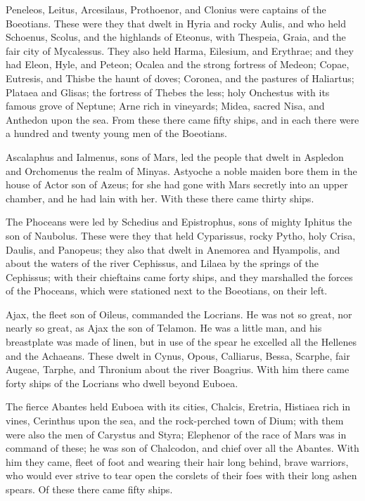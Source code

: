 Peneleos, Leitus, Arcesilaus, Prothoenor, and Clonius were captains of the
Boeotians. These were they that dwelt in Hyria and rocky Aulis, and who
held Schoenus, Scolus, and the highlands of Eteonus, with Thespeia, Graia,
and the fair city of Mycalessus. They also held Harma, Eilesium, and
Erythrae; and they had Eleon, Hyle, and Peteon; Ocalea and the strong
fortress of Medeon; Copae, Eutresis, and Thisbe the haunt of doves;
Coronea, and the pastures of Haliartus; Plataea and Glisas; the fortress
of Thebes the less; holy Onchestus with its famous grove of Neptune; Arne
rich in vineyards; Midea, sacred Nisa, and Anthedon upon the sea. From
these there came fifty ships, and in each there were a hundred and twenty
young men of the Boeotians.

Ascalaphus and Ialmenus, sons of Mars, led the people that dwelt in
Aspledon and Orchomenus the realm of Minyas. Astyoche a noble maiden bore
them in the house of Actor son of Azeus; for she had gone with Mars
secretly into an upper chamber, and he had lain with her. With these there
came thirty ships.

The Phoceans were led by Schedius and Epistrophus, sons of mighty Iphitus
the son of Naubolus. These were they that held Cyparissus, rocky Pytho,
holy Crisa, Daulis, and Panopeus; they also that dwelt in Anemorea and
Hyampolis, and about the waters of the river Cephissus, and Lilaea by the
springs of the Cephissus; with their chieftains came forty ships, and they
marshalled the forces of the Phoceans, which were stationed next to the
Boeotians, on their left.

Ajax, the fleet son of Oileus, commanded the Locrians. He was not so
great, nor nearly so great, as Ajax the son of Telamon. He was a little
man, and his breastplate was made of linen, but in use of the spear he
excelled all the Hellenes and the Achaeans. These dwelt in Cynus, Opous,
Calliarus, Bessa, Scarphe, fair Augeae, Tarphe, and Thronium about the
river Boagrius. With him there came forty ships of the Locrians who dwell
beyond Euboea.

The fierce Abantes held Euboea with its cities, Chalcis, Eretria, Histiaea
rich in vines, Cerinthus upon the sea, and the rock-perched town of Dium;
with them were also the men of Carystus and Styra; Elephenor of the race
of Mars was in command of these; he was son of Chalcodon, and chief over
all the Abantes. With him they came, fleet of foot and wearing their hair
long behind, brave warriors, who would ever strive to tear open the
corslets of their foes with their long ashen spears. Of these there came
fifty ships.


